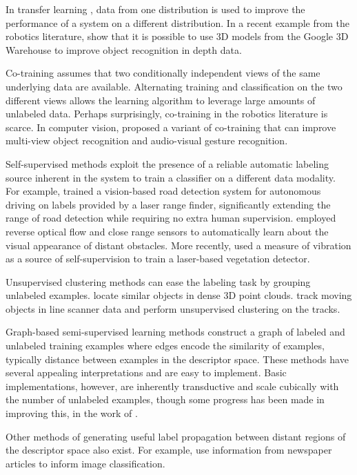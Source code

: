 \documentclass[conference]{IEEEtran}
\begin{document}
In transfer learning \cite{Pan2010}, data from one distribution is used to improve the performance of a system on a different distribution.  In a recent example from the robotics literature, \citet{Lai2010,Lai2009} show that it is possible to use 3D models from the Google 3D Warehouse to improve object recognition in depth data.

Co-training \cite{Mitchell1998} assumes that two conditionally independent views of the same underlying data are available.  Alternating training and classification on the two different views allows the learning algorithm to leverage large amounts of unlabeled data.  Perhaps surprisingly, co-training in the robotics literature is scarce.  In computer vision, \citet{Christoudias2009} proposed a variant of co-training that can improve multi-view object recognition and audio-visual gesture recognition.

Self-supervised methods exploit the presence of a reliable automatic labeling source inherent in the system to train a classifier on a different data modality.  For example, \citet{Dahlkamp2006} trained a vision-based road detection system for autonomous driving on labels provided by a laser range finder, significantly extending the range of road detection while requiring no extra human supervision. \citet{Lookingbill2007} employed reverse optical flow and close range sensors to automatically learn about the visual appearance of distant obstacles.  More recently, \citet{Wurm2009} used a measure of vibration as a source of self-supervision to train a laser-based vegetation detector.

Unsupervised clustering methods can ease the labeling task by grouping unlabeled examples.  \citet{Triebel2010} locate similar objects in dense 3D point clouds.  \citet{Luber2008} track moving objects in line scanner data and perform unsupervised clustering on the tracks.

Graph-based semi-supervised learning methods \cite{Zhu2003} construct a graph of labeled and unlabeled training examples where edges encode the similarity of examples, typically distance between examples in the descriptor space.  These methods have several appealing interpretations and are easy to implement.  Basic implementations, however, are inherently transductive and scale cubically with the number of unlabeled examples, though some progress has been made in improving this, \eg in the work of \citet{Liu2010}.  

Other methods of generating useful label propagation between distant regions of the descriptor space also exist.  For example, \citet{Socher2010} use information from newspaper articles to inform image classification.
\end{document}
